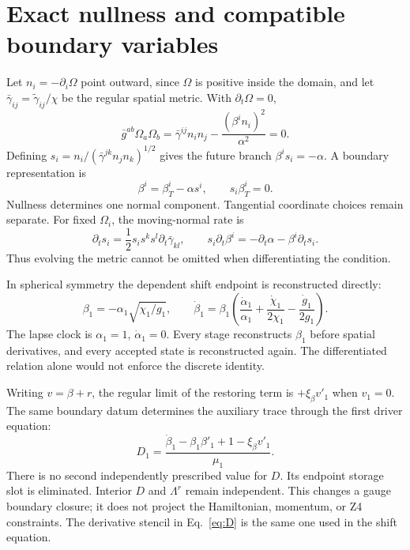 \documentclass[11pt]{article}
\begin{document}
\section{Exact nullness and compatible boundary variables}
Let $n_i=-\partial_i\Omega$ point outward, since $\Omega$ is positive inside the domain, and let $\bar\gamma_{ij}=\tilde\gamma_{ij}/\chi$ be the regular spatial metric. With $\partial_t\Omega=0$,
\begin{equation}
 \bar g^{ab}\Omega_a\Omega_b
 =\bar\gamma^{ij}n_i n_j-\frac{(\beta^i n_i)^2}{\alpha^2}=0.
\end{equation}
Defining $s_i=n_i/(\bar\gamma^{jk}n_jn_k)^{1/2}$ gives the future branch $\beta^is_i=-\alpha$. A boundary representation is
\begin{equation}
 \beta^i=\beta_T^i-\alpha s^i,\qquad s_i\beta_T^i=0.
\end{equation}
Nullness determines one normal component. Tangential coordinate choices remain separate. For fixed $\Omega_i$, the moving-normal rate is
\begin{equation}
 \partial_t s_i=\frac12s_i s^ks^l\partial_t\bar\gamma_{kl},\qquad
 s_i\partial_t\beta^i=-\partial_t\alpha-\beta^i\partial_t s_i.
\end{equation}
Thus evolving the metric cannot be omitted when differentiating the condition.

In spherical symmetry the dependent shift endpoint is reconstructed directly:
\begin{equation}
 \beta_1=-\alpha_1\sqrt{\chi_1/g_1},\qquad
 \dot\beta_1=\beta_1\left(\frac{\dot\alpha_1}{\alpha_1}
          +\frac{\dot\chi_1}{2\chi_1}-\frac{\dot g_1}{2g_1}\right).\label{eq:normal}
\end{equation}
The lapse clock is $\alpha_1=1$, $\dot\alpha_1=0$. Every stage reconstructs $\beta_1$ before spatial derivatives, and every accepted state is reconstructed again. The differentiated relation alone would not enforce the discrete identity.

Writing $v=\beta+r$, the regular limit of the restoring term is $+\xi_\beta v'_1$ when $v_1=0$. The same boundary datum determines the auxiliary trace through the first driver equation:
\begin{equation}
 D_1=\frac{\dot\beta_1-\beta_1\beta'_1+1-\xi_\beta v'_1}{\mu_1}.\label{eq:D}
\end{equation}
There is no second independently prescribed value for $D$. Its endpoint storage slot is eliminated. Interior $D$ and $\Lambda^r$ remain independent. This changes a gauge boundary closure; it does not project the Hamiltonian, momentum, or Z4 constraints. The derivative stencil in Eq.~\eqref{eq:D} is the same one used in the shift equation.
\end{document}
